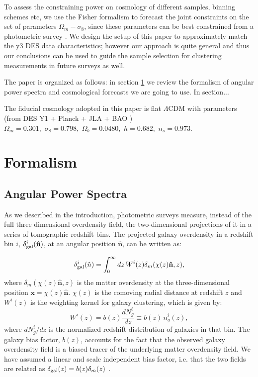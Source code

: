 \documentclass[a4paper,fleqn,usenatbib]{mnras}
\begin{document}
To assess the constraining power on cosmology of different samples, binning schemes etc, we use the Fisher formalism to forecast the joint constraints on the set of parameters $\Omega_m - \sigma_8$,  since these parameters can be best constrained from a photometric survey \citep{DES1}. We design the setup of this paper to approximately match the y3 DES data characteristics; however our approach is quite general and thus our conclusions can be used to guide the sample selection for clustering measurements in future surveys as well. 

The paper is organized as follows:  in section \ref{sec: formalism} we review the formalism of  angular power spectra and cosmological forecasts we are going to use. In section...

The fiducial cosmology adopted in this paper is flat $\Lambda$CDM with parameters (from DES Y1 + Planck + JLA + BAO \citep[TABLE II]{DES1}) $\Omega_m = 0.301, \,\,\sigma_8 = 0.798, \,\, \Omega_b = 0.0480, \,\, h = 0.682, \,\, n_s = 0.973$. 



\section{Formalism}
\label{sec: formalism} %


\subsection{Angular Power Spectra}
\label{subsec: APS}

As we described in the introduction, photometric surveys measure, instead of the full three dimensional overdensity  field, the  two-dimensional projections of it in a series of tomographic redshift bins. The projected galaxy overdensity in a redshift bin $i$, $\delta^i_{\mbox{\scriptsize{gal}}}(\mathbf{\hat{n}})$, at an angular position $\mathbf{\hat{n}}$, can be written as:

\begin{equation}
\delta^i_{\mbox{\scriptsize{gal}}}(\hat{n})  = \int_0^\infty  dz\, W^i(z) \delta_m(\chi(z)\mathbf{\hat{n}},z),
\end{equation}
where  $\delta_m(\chi(z)\mathbf{\hat{n}},z)$  is the matter overdensity at the three-dimensional position $\mathbf{x} = \chi (z)\mathbf{\hat{n}}$.  $\chi(z)$ is the comoving radial distance at redshift $z$ and $W^{i}(z)$ is the weighting kernel for galaxy clustering, which is given by:
\begin{equation}
W^{i}(z) = b(z)\frac{dN_g^i}{dz} \equiv b(z)\,n^i_g(z),
\end{equation}
where $dN_g^i/dz$ is the normalized redshift distribution of galaxies in that bin. The galaxy bias factor, $b(z)$, accounts for the fact that the observed galaxy overdensity field is a biased tracer of the underlying matter overdensity field.  We have assumed a linear and scale independent bias factor, i.e. that the two fields are related as $\delta_{\mbox{\scriptsize{gal}}} (z) = b(z) \delta_m(z)$ \citep{Fry1993}.
\end{document}
